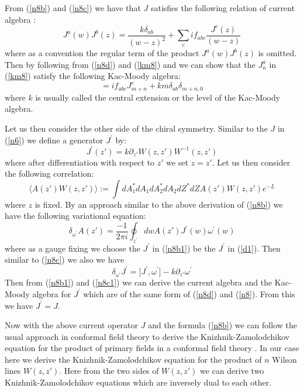 \documentclass[a4paper,a4paper]{article}
\begin{document}
From (\ref{n8b}) and (\ref{n8c}) we have that $J$ satisfies
the following relation of current algebra \cite{Fra}\cite{Fuc}\cite{Kni}:
\begin{equation}
J^a(w)J^b(z)=\frac{k\delta_{ab}}{(w-z)^2}
+\sum_{c}if_{abc}\frac{J^c(z)}{(w-z)}
\label{n8d}
\end{equation}
where as a convention the regular term of the product $J^a(w)J^b(z)$
is omitted.
Then by following \cite{Fra}\cite{Fuc}\cite{Kni} from (\ref{n8d}) and (\ref{km8}) and  we can show that 
the $J_n^a$ in (\ref{km8}) satisfy the following  Kac-Moody algebra: 
\begin{equation}
[J_m^a, J_n^b] =
if_{abc}J_{m+n}^c + km\delta_{ab}\delta_{m+n, 0}
\label{n8}
\end{equation}
where $k$ is  usually called the central extension
or the level of the Kac-Moody algebra.

Let us then consider the other side of the chiral symmetry. 
Similar to the $J$ in (\ref{n6}) we define a
generator $J^{\prime}$ by:
\begin{equation}
J^{\prime}(z')= k\partial_{z'}W(z, z')W^{-1}(z, z')
\label{d1}
\end{equation}
where after differentiation with respect to $z'$
we set $z=z'$. 
Let us then consider
 the following correlation:
\begin{equation}
\langle A(z')W(z,z') \rangle := 
\int dA_1^{*}dA_1dA_2^{*}dA_2dZ^{*}dZ
  A(z')W(z,z')e^{-L}
\label{n8aa}
\end{equation}
where $z$ is fixed.
By an approach similar to the above derivation of (\ref{n8b})
we have the following  variational equation:
\begin{equation}
\delta_{\omega^{\prime}}A(z')
=\frac{-1}{2\pi i}\oint_{z^{\prime}} dwA(z')J^{\prime}(w)
\omega^{\prime}(w)
\label{n8b1}
\end{equation}
where as a gauge fixing we choose the $J^{\prime}$
in (\ref{n8b1}) be the $J^{\prime}$ in (\ref{d1}).
Then similar to (\ref{n8c}) we also we have
\begin{equation}
\delta_{\omega^{\prime}}J^{\prime}= 
\lbrack  J^{\prime}, \omega^{\prime}\rbrack -k\partial_{z'} \omega^{\prime}
\label{n8c1}
\end{equation}
Then from (\ref{n8b1}) and (\ref{n8c1}) we can derive the current
algebra and the Kac-Moody algebra for $J^{\prime}$ which are of the
same form of (\ref{n8d}) and (\ref{n8}).
From this we  have $J^{\prime}=J$.

Now with the above current operator $J$ and the formula (\ref{n8b}) we can follow the usual approach
in conformal field theory to derive the
Knizhnik-Zamolodchikov equation for the product of 
primary fields in a conformal field theory \cite{Fra}\cite{Fuc}\cite{Ng}.
In our case here we  derive the 
Knizhnik-Zamolodchikov equation for the product of
$n$ Wilson lines
$W(z, z')$.
Here from the two sides of 
$W(z, z')$  we can derive two Knizhnik-Zamolodchikov equations which are inversely dual to each other. 
\end{document}
